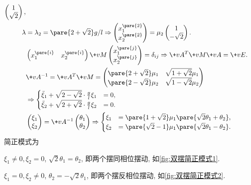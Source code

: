 \documentclass[../LectureNotes.tex]{subfiles}
\begin{document}
\begin{sample}
\begin{ex}
\begin{align*}
\begin{pmatrix}
                1 \\ \sqrt{2}
            \end{pmatrix}, \\
            \lambda &= \lambda_2 = \pare{2+\sqrt{2}}g/l \Rightarrow \begin{pmatrix}
                x_1^{\pare{2}} \\ x_2^{\pare{2}}
            \end{pmatrix} = \mu_2 \begin{pmatrix}
                1 \\ -\sqrt{2}
            \end{pmatrix}. \\
            &\begin{pmatrix}
                x_1^{\pare{i}} & x_2^{\pare{i}}
            \end{pmatrix} \+vM \begin{pmatrix}
                x_1^{\pare{j}} \\ x_2^{\pare{j}}
            \end{pmatrix} = \delta_{ij} \Rightarrow \+vA^T \+vM\+vA = \+vE. \\
            &\+vA^{-1} = \+vA^T \+vM = \begin{pmatrix}
                \pare{2+\sqrt{2}} \mu_1 & \sqrt{1+\sqrt{2}}\mu_1 \\
                \pare{2-\sqrt{2}}\mu_2 & \sqrt{1-\sqrt{2}} \mu_2
            \end{pmatrix} \\ &\Rightarrow \begin{cases}
                \ddot{\xi}_1 + \sqrt{2-\sqrt{2}} \cdot \frac{g}{l} \xi_1 &= 0, \\
                \ddot{\xi}_2 + \sqrt{2+\sqrt{2}} \cdot \frac{g}{l} \xi_2 &= 0.
            \end{cases}\\
            & \begin{pmatrix}
                \xi_1 \\ \xi_2
            \end{pmatrix} = \+vA^{-1} \begin{pmatrix}
                \theta_1 \\ \theta_2
            \end{pmatrix} \Rightarrow \begin{cases}
                \xi_1 &= \pare{1+\sqrt{2}} \mu_1\pare{\sqrt{2}\theta_1 + \theta_2}, \\
                \xi_2 &= \pare{\sqrt{2}-1} \mu_1\pare{\sqrt{2}\theta_1 - \theta_2}.
            \end{cases}
        \end{align*}
        简正模式为
        \begin{cenum}
            \item $\xi_1 \neq 0, \xi_2 = 0$, $\sqrt{2}\theta_1 = \theta_2$, 即两个摆同相位摆动, 如\cref{fig:双摆简正模式1}.
            \item $\xi_1 = 0, \xi_2 \neq 0$, $\theta_2 = -\sqrt{2}\theta_1$, 即两个摆反相位摆动, 如\cref{fig:双摆简正模式2}.
        \end{cenum}
    \end{ex}
\end{sample}
\end{document}
